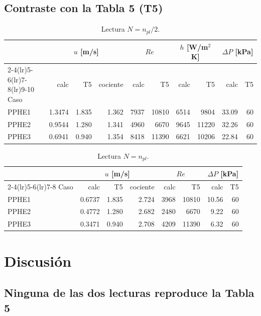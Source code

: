 \documentclass[11pt,a4paper]{article}
\begin{document}
\subsection{Contraste con la Tabla 5 (T5)}

\begin{table}[h]
\centering
\begin{tabular}{lrrrrrrrrr}
\toprule
& \multicolumn{3}{c}{$u$ [m/s]} & \multicolumn{2}{c}{$Re$} & \multicolumn{2}{c}{$h$ [W/m$^2$K]} & \multicolumn{2}{c}{$\Delta P$ [kPa]}\\
\cmidrule(lr){2-4}\cmidrule(lr){5-6}\cmidrule(lr){7-8}\cmidrule(lr){9-10}
Caso & calc & T5 & cociente & calc & T5 & calc & T5 & calc & T5\\
\midrule
PPHE1 & 1.3474 & 1.835 & 1.362 & 7937 & 10810 & 6514 &  9804 & 33.09 & 60\\
PPHE2 & 0.9544 & 1.280 & 1.341 & 4960 &  6670 & 9645 & 11220 & 32.26 & 60\\
PPHE3 & 0.6941 & 0.940 & 1.354 & 8418 & 11390 & 6621 & 10206 & 22.84 & 60\\
\bottomrule
\end{tabular}
\caption{Lectura $N = n_{pl}/2$.}
\end{table}

\begin{table}[h]
\centering
\begin{tabular}{lrrrrrrr}
\toprule
& \multicolumn{3}{c}{$u$ [m/s]} & \multicolumn{2}{c}{$Re$} & \multicolumn{2}{c}{$\Delta P$ [kPa]}\\
\cmidrule(lr){2-4}\cmidrule(lr){5-6}\cmidrule(lr){7-8}
Caso & calc & T5 & cociente & calc & T5 & calc & T5\\
\midrule
PPHE1 & 0.6737 & 1.835 & 2.724 & 3968 & 10810 & 10.56 & 60\\
PPHE2 & 0.4772 & 1.280 & 2.682 & 2480 &  6670 &  9.22 & 60\\
PPHE3 & 0.3471 & 0.940 & 2.708 & 4209 & 11390 &  6.32 & 60\\
\bottomrule
\end{tabular}
\caption{Lectura $N = n_{pl}$.}
\end{table}

\section{Discusión}

\subsection{Ninguna de las dos lecturas reproduce la Tabla 5}
\end{document}

